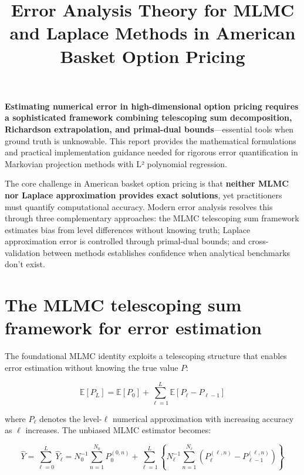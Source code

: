\documentclass[11pt,a4paper]{article}
\title{\textbf{Error Analysis Theory for MLMC and Laplace Methods in American Basket Option Pricing}}
\author{}
\date{}
\begin{document}
\maketitle

\noindent\textbf{Estimating numerical error in high-dimensional option pricing requires a sophisticated framework combining telescoping sum decomposition, Richardson extrapolation, and primal-dual bounds}---essential tools when ground truth is unknowable. This report provides the mathematical formulations and practical implementation guidance needed for rigorous error quantification in Markovian projection methods with L² polynomial regression.

\vspace{0.3cm}

\noindent The core challenge in American basket option pricing is that \textbf{neither MLMC nor Laplace approximation provides exact solutions}, yet practitioners must quantify computational accuracy. Modern error analysis resolves this through three complementary approaches: the MLMC telescoping sum framework estimates bias from level differences without knowing truth; Laplace approximation error is controlled through primal-dual bounds; and cross-validation between methods establishes confidence when analytical benchmarks don't exist.

\section{The MLMC telescoping sum framework for error estimation}

The foundational MLMC identity exploits a telescoping structure that enables error estimation without knowing the true value $P$:

\begin{equation}
\mathbb{E}[P_L] = \mathbb{E}[P_0] + \sum_{\ell=1}^{L} \mathbb{E}[P_\ell - P_{\ell-1}]
\end{equation}

\noindent where $P_\ell$ denotes the level-$\ell$ numerical approximation with increasing accuracy as $\ell$ increases. The unbiased MLMC estimator becomes:

\begin{equation}
\hat{Y} = \sum_{\ell=0}^{L} \hat{Y}_\ell = N_0^{-1}\sum_{n=1}^{N_0} P_0^{(0,n)} + \sum_{\ell=1}^{L} \left\{ N_\ell^{-1} \sum_{n=1}^{N_\ell} \left(P_\ell^{(\ell,n)} - P_{\ell-1}^{(\ell,n)}\right) \right\}
\end{equation}
\end{document}
